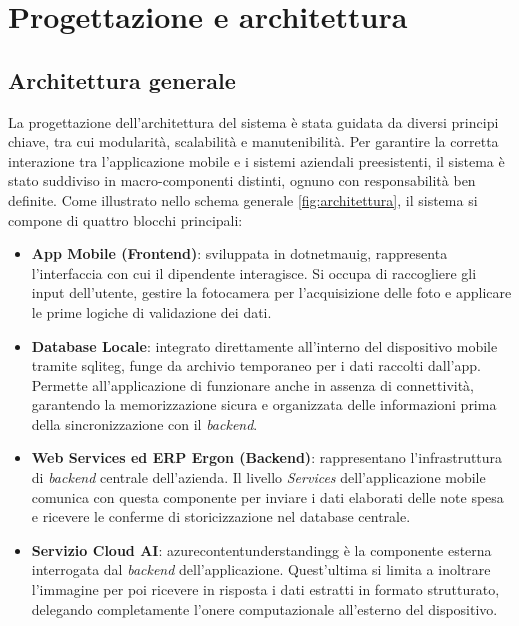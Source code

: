 \chapter{Progettazione e architettura}
\label{chap:progettazione-architettura}

\section{Architettura generale}
\label{sec:architettura-generale}
\noindent La progettazione dell'architettura del sistema è stata guidata da diversi principi chiave, tra cui modularità, scalabilità e manutenibilità. Per garantire la corretta interazione tra l'applicazione mobile e i sistemi aziendali preesistenti, il sistema è stato suddiviso in macro-componenti distinti, ognuno con responsabilità ben definite. Come illustrato nello schema generale \ref{fig:architettura}, il sistema si compone di quattro blocchi principali:
\begin{itemize}
    \item \textbf{App Mobile (Frontend)}: sviluppata in \gls{dotnetmauig}, rappresenta l'interfaccia con cui il dipendente interagisce. Si occupa di raccogliere gli input dell'utente, gestire la fotocamera per l'acquisizione delle foto e applicare le prime logiche di validazione dei dati.
    \item \textbf{Database Locale}: integrato direttamente all'interno del dispositivo mobile tramite \gls{sqliteg}, funge da archivio temporaneo per i dati raccolti dall'app. Permette all'applicazione di funzionare anche in assenza di connettività, garantendo la memorizzazione sicura e organizzata delle informazioni prima della sincronizzazione con il \textit{backend}.
    \item \textbf{Web Services ed ERP Ergon (Backend)}: rappresentano l'infrastruttura di \textit{backend} centrale dell'azienda. Il livello \textit{Services} dell'applicazione mobile comunica con questa componente per inviare i dati elaborati delle note spesa e ricevere le conferme di storicizzazione nel database centrale. 
    \item \textbf{Servizio Cloud AI}: \gls{azurecontentunderstandingg} è la componente esterna interrogata dal \textit{backend} dell'applicazione. Quest'ultima si limita a inoltrare l'immagine per poi ricevere in risposta i dati estratti in formato strutturato, delegando completamente l'onere computazionale all'esterno del dispositivo.
\end{itemize}

